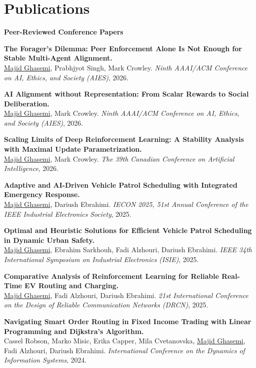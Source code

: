 \documentclass[letterpaper,11pt]{article}
\newcommand{\me}{\underline{Majid Ghasemi}}
\begin{document}
\section{Publications}



\textbf{\small Peer-Reviewed Conference Papers}
\begin{clist}
  \item \textbf{The Forager's Dilemma: Peer Enforcement Alone Is Not Enough for Stable Multi-Agent Alignment.}\\
        \me, Prabhjyot Singh, Mark Crowley.
        \textit{Ninth AAAI/ACM Conference on AI, Ethics, and Society (AIES)}, 2026.
  \item \textbf{AI Alignment without Representation: From Scalar Rewards to Social Deliberation.}\\
        \me, Mark Crowley.
        \textit{Ninth AAAI/ACM Conference on AI, Ethics, and Society (AIES)}, 2026.
    \item \textbf{Scaling Limits of Deep Reinforcement Learning: A Stability Analysis with Maximal Update Parametrization.}\\
        \me, Mark Crowley.
        \textit{The 39th Canadian Conference on Artificial Intelligence}, 2026.
  \item \textbf{Adaptive and AI-Driven Vehicle Patrol Scheduling with Integrated Emergency Response.}\\
        \me, Dariush Ebrahimi.
        \textit{IECON 2025, 51st Annual Conference of the IEEE Industrial Electronics Society}, 2025.
  \item \textbf{Optimal and Heuristic Solutions for Efficient Vehicle Patrol Scheduling in Dynamic Urban Safety.}\\
        \me, Ebrahim Sarkhouh, Fadi Alzhouri, Dariush Ebrahimi.
        \textit{IEEE 34th International Symposium on Industrial Electronics (ISIE)}, 2025.
  \item \textbf{Comparative Analysis of Reinforcement Learning for Reliable Real-Time EV Routing and Charging.}\\
        \me, Fadi Alzhouri, Dariush Ebrahimi.
        \textit{21st International Conference on the Design of Reliable Communication Networks (DRCN)}, 2025.
  \item \textbf{Navigating Smart Order Routing in Fixed Income Trading with Linear Programming and Dijkstra's Algorithm.}\\
        Cassel Robson, Marko Misic, Erika Capper, Mila Cvetanovska, \me, Fadi Alzhouri, Dariush Ebrahimi.
        \textit{International Conference on the Dynamics of Information Systems}, 2024.
\end{clist}
\end{document}
